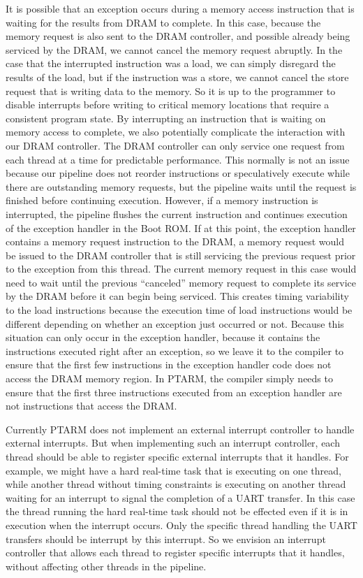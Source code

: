 It is possible that an exception occurs during a memory access instruction that is waiting for the results from DRAM to complete. 
In this case, because the memory request is also sent to the DRAM controller, and possible already being serviced by the DRAM, we cannot cancel the memory request abruptly.
In the case that the interrupted instruction was a load, we can simply disregard the results of the load, but if the instruction was a store, we cannot cancel the store request that is writing data to the memory.
So it is up to the programmer to disable interrupts before writing to critical memory locations that require a consistent program state.
By interrupting an instruction that is waiting on memory access to complete, we also potentially complicate the interaction with our DRAM controller.
The DRAM controller can only service one request from each thread at a time for predictable performance.
This normally is not an issue because our pipeline does not reorder instructions or speculatively execute while there are outstanding memory requests, but the pipeline waits until the request is finished before continuing execution.
However, if a memory instruction is interrupted, the pipeline flushes the current instruction and continues execution of the exception handler in the Boot ROM.
If at this point, the exception handler contains a memory request instruction to the DRAM, a memory request would be issued to the DRAM controller that is still servicing the previous request prior to the exception from this thread.
The current memory request in this case would need to wait until the previous ``canceled'' memory request to complete its service by the DRAM before it can begin being serviced.
This creates timing variability to the load instructions because the execution time of load instructions would be different depending on whether an exception just occurred or not.
Because this situation can only occur in the exception handler, because it contains the instructions executed right after an exception, so we leave it to the compiler to ensure that the first few instructions in the exception handler code does not access the DRAM memory region.
In PTARM, the compiler simply needs to ensure that the first three instructions executed from an exception handler are not instructions that access the DRAM.

Currently PTARM does not implement an external interrupt controller to handle external interrupts. 
But when implementing such an interrupt controller, each thread should be able to register specific external interrupts that it handles.
For example, we might have a hard real-time task that is executing on one thread, while another thread without timing constraints is executing on another thread waiting for an interrupt to signal the completion of a UART transfer.
In this case the thread running the hard real-time task should not be effected even if it is in execution when the interrupt occurs.
Only the specific thread handling the UART transfers should be interrupt by this interrupt.  
So we envision an interrupt controller that allows each thread to register specific interrupts that it handles, without affecting other threads in the pipeline.  

